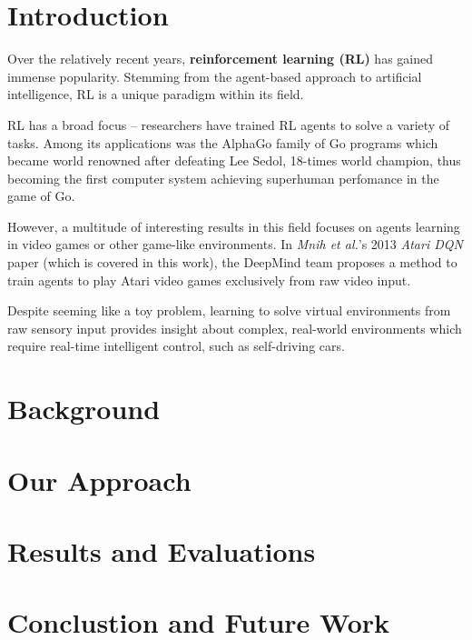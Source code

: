 \documentclass[12pt,twoside]{report}
\begin{document}
\tableofcontents


\chapter{Introduction}
Over the relatively recent years, \textbf{reinforcement learning (RL)} has gained immense popularity.
Stemming from the agent-based approach to artificial intelligence, RL is a unique paradigm within its field.

RL has a broad focus -- researchers have trained RL agents to solve a variety of tasks.
Among its applications was the AlphaGo family of Go programs \cite{ago, alpha-zero} which became world renowned after defeating Lee Sedol, 18-times world champion, thus becoming the first computer system achieving superhuman perfomance in the game of Go.

However, a multitude of interesting results in this field focuses on agents learning in video games or other game-like environments.
In \emph{Mnih et al.}'s 2013 \emph{Atari DQN} paper \cite{atari-dqn} (which is covered in this work), the DeepMind team proposes a method to train agents to play Atari video games exclusively from raw video input.

Despite seeming like a toy problem, learning to solve virtual environments from raw sensory input provides insight about complex, real-world environments which require real-time intelligent control, such as self-driving cars.

\chapter{Background}


\chapter{Our Approach}


\chapter{Results and Evaluations}


\chapter{Conclustion and Future Work}



\end{document}
